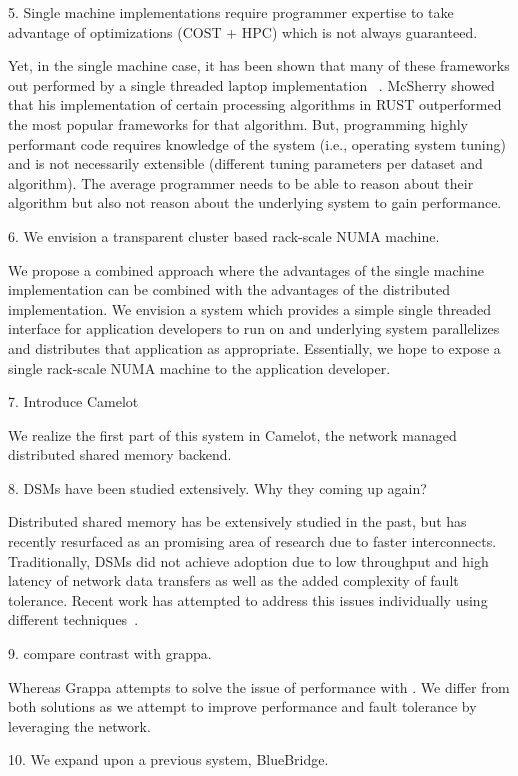 \ac{5. Single machine implementations require programmer expertise to take
	advantage of optimizations (COST + HPC) which is not always guaranteed.}

Yet, in the single machine case, it has been shown that
many of these frameworks out performed by a single threaded laptop
implementation ~\cite{189908}. McSherry showed that his implementation of
certain processing algorithms in RUST outperformed the most popular frameworks
for that algorithm. But, programming highly performant code requires knowledge
of the system (i.e., operating system tuning) and is not necessarily extensible 
(different tuning parameters per dataset and algorithm). The average programmer
needs to be able to reason about their algorithm but also not reason
about the underlying system to gain performance. 

\ac{6. We envision a transparent cluster based rack-scale NUMA machine.}

We propose a combined approach where the advantages of the single machine
implementation can be combined with the advantages of the distributed
implementation. We envision a system which provides a simple single threaded
interface for application developers to run on and underlying
system parallelizes and distributes that application as appropriate.
Essentially, we hope to expose a single rack-scale NUMA machine to the
application developer. 

\ac{7. Introduce Camelot}

We realize the first part of this system in Camelot, the network managed
distributed shared memory backend. 

\ac{8. DSMs have been studied extensively. Why they coming up again?}

Distributed shared memory has be extensively studied in the past, but has
recently resurfaced as an promising area of research due to faster
interconnects. Traditionally, DSMs did not achieve adoption due to low
throughput and high latency of network data transfers as well as the added
complexity of fault tolerance. Recent work has attempted to address this issues
individually using different techniques~\cite{Ongaro2011,Nelson2015}.

\ac{9. compare contrast with grappa.}

Whereas Grappa attempts to solve the issue of performance with . 
We differ from both solutions as we attempt to improve performance and fault
tolerance by leveraging the network. 

\ac{10. We expand upon a previous system, BlueBridge.}

